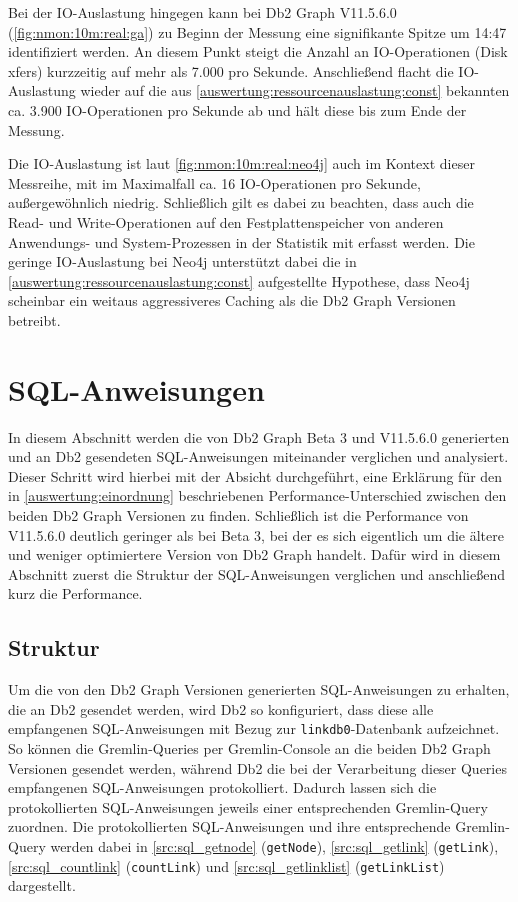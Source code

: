 Bei der IO-Auslastung hingegen kann bei Db2 Graph V11.5.6.0 (\autoref{fig:nmon:10m:real:ga}) zu Beginn der Messung eine signifikante Spitze um 14:47 identifiziert werden. An diesem Punkt steigt die Anzahl an IO-Operationen (Disk xfers) kurzzeitig auf mehr als 7.000 pro Sekunde. Anschließend flacht die IO-Auslastung wieder auf die aus \autoref{auswertung:ressourcenauslastung:const} bekannten ca. 3.900 IO-Operationen pro Sekunde ab und hält diese bis zum Ende der Messung.

Die IO-Auslastung ist laut \autoref{fig:nmon:10m:real:neo4j} auch im Kontext dieser Messreihe, mit im Maximalfall ca. 16 IO-Operationen pro Sekunde, außergewöhnlich niedrig. Schließlich gilt es dabei zu beachten, dass auch die Read- und Write-Operationen auf den Festplattenspeicher von anderen Anwendungs- und System-Prozessen in der Statistik mit erfasst werden. Die geringe IO-Auslastung bei Neo4j unterstützt dabei die in \autoref{auswertung:ressourcenauslastung:const} aufgestellte Hypothese, dass Neo4j scheinbar ein weitaus aggressiveres Caching als die Db2 Graph Versionen betreibt.

\section{SQL-Anweisungen}
\label{sql}
In diesem Abschnitt werden die von Db2 Graph Beta 3 und V11.5.6.0 generierten und an Db2 gesendeten SQL-Anweisungen miteinander verglichen und analysiert. Dieser Schritt wird hierbei mit der Absicht durchgeführt, eine Erklärung für den in \autoref{auswertung:einordnung} beschriebenen Performance-Unterschied zwischen den beiden Db2 Graph Versionen zu finden. Schließlich ist die Performance von V11.5.6.0  deutlich geringer als bei Beta 3, bei der es sich eigentlich um die ältere und weniger optimiertere Version von Db2 Graph handelt. Dafür wird in diesem Abschnitt zuerst die Struktur der SQL-Anweisungen verglichen und anschließend kurz die Performance. 

\subsection{Struktur}
\label{sql:struktur}
Um die von den Db2 Graph Versionen generierten SQL-Anweisungen zu erhalten, die an Db2 gesendet werden, wird Db2 so konfiguriert, dass diese alle empfangenen SQL-Anweisungen mit Bezug zur \texttt{linkdb0}-Datenbank aufzeichnet. So können die Gremlin-Queries per Gremlin-Console an die beiden Db2 Graph Versionen gesendet werden, während Db2 die bei der Verarbeitung dieser Queries empfangenen SQL-Anweisungen protokolliert. Dadurch lassen sich die protokollierten SQL-Anweisungen jeweils einer entsprechenden Gremlin-Query zuordnen. Die protokollierten SQL-Anweisungen und ihre entsprechende Gremlin-Query werden dabei in \autoref{src:sql_getnode} (\texttt{getNode}), \autoref{src:sql_getlink} (\texttt{getLink}), \autoref{src:sql_countlink} (\texttt{countLink}) und \autoref{src:sql_getlinklist} (\texttt{getLinkList}) dargestellt.

